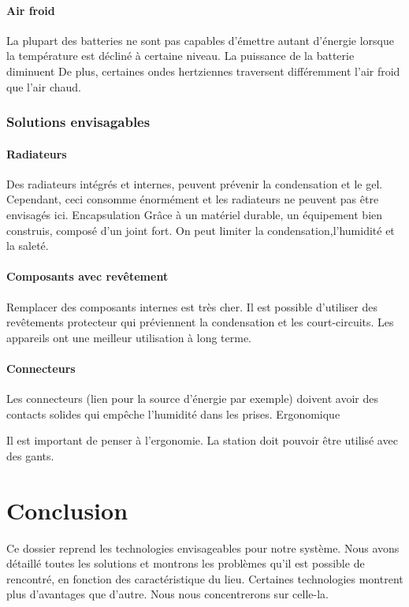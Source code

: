 \paragraph{Air froid}

La plupart des batteries ne sont pas capables d’émettre autant d'énergie lorsque la température est décliné à certaine niveau. La puissance de la batterie diminuent
De plus, certaines ondes hertziennes traversent différemment l’air froid que l’air chaud\footnotemark.


\subsubsection{Solutions envisagables}

\paragraph{Radiateurs}

Des radiateurs intégrés et internes, peuvent prévenir la condensation et le gel. Cependant, ceci consomme énormément et les radiateurs ne peuvent pas être envisagés ici.
Encapsulation
Grâce à un matériel durable, un équipement bien construis, composé d’un joint fort. On peut limiter la condensation,l’humidité et la saleté.

\paragraph{Composants avec revêtement}

Remplacer des composants internes est très cher. Il est possible d’utiliser des revêtements protecteur qui préviennent la condensation et les court-circuits. Les appareils ont une meilleur utilisation à long terme.

\paragraph{Connecteurs}

Les connecteurs (lien pour la source d’énergie par exemple) doivent avoir des contacts solides qui empêche l’humidité dans les prises.
Ergonomique

Il est important de penser à l’ergonomie. La station doit pouvoir être utilisé avec des gants.

\section{Conclusion}

Ce dossier reprend les technologies envisageables pour notre système. Nous avons détaillé toutes les solutions et montrons les problèmes qu’il est possible de rencontré, en fonction des caractéristique du lieu. Certaines technologies montrent plus d’avantages que d’autre. Nous nous concentrerons sur celle-la.